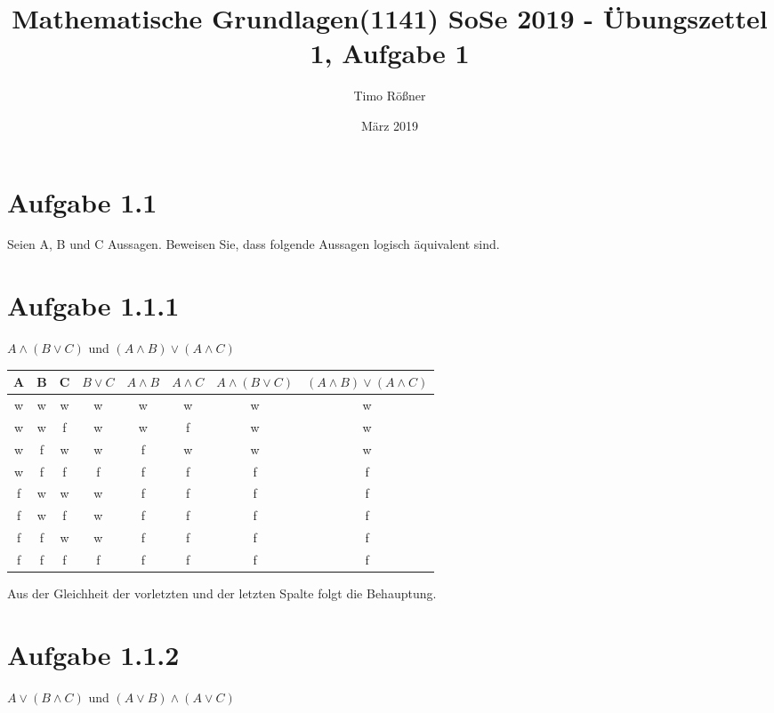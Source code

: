 \documentclass{article}
\title{Mathematische Grundlagen(1141) SoSe 2019 - Übungszettel 1, Aufgabe 1}
\author{Timo Rößner }
\date{März 2019}
\begin{document}
\maketitle

\section*{Aufgabe 1.1}

Seien A, B und C Aussagen. Beweisen Sie, dass folgende Aussagen logisch äquivalent sind.

\section*{Aufgabe 1.1.1}

\(A \wedge (B \lor C)\) und \((A \wedge B) \lor (A \wedge C)\)

\begin{center}
\begin{tabular}{ |c|c|c|c|c|c|c|c| }
 \hline
 A & B & C & \(B \lor C\) & \(A \wedge B\) & \(A \wedge C\) & \(A \wedge (B \lor C)\)& \((A \wedge B) \lor (A \wedge C)\) \\
 \hline\hline
 w & w & w & w & w & w & w & w \\
 w & w & f & w & w & f & w & w \\
 w & f & w & w & f & w & w & w \\
 w & f & f & f & f & f & f & f \\
 f & w & w & w & f & f & f & f \\
 f & w & f & w & f & f & f & f \\
 f & f & w & w & f & f & f & f \\
 f & f & f & f & f & f & f & f \\
 \hline
\end{tabular}
\end{center}

Aus der Gleichheit der vorletzten und der letzten Spalte folgt die Behauptung.

\section*{Aufgabe 1.1.2}

\(A \lor (B \wedge C)\) und \((A \lor B) \wedge (A \lor C)\)
\end{document}
